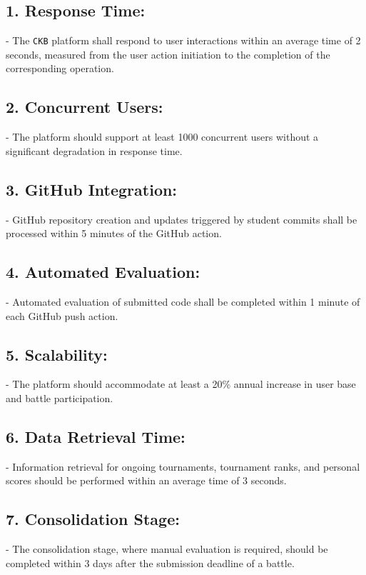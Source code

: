 \subsection*{1. Response Time:}
   - The \verb|CKB| platform shall respond to user interactions within an average time of 2 seconds, measured from the user action initiation to the completion of the corresponding operation.

\subsection*{2. Concurrent Users:}
   - The platform should support at least 1000 concurrent users without a significant degradation in response time.

\subsection*{3. GitHub Integration:}
   - GitHub repository creation and updates triggered by student commits shall be processed within 5 minutes of the GitHub action.

\subsection*{4. Automated Evaluation:}
   - Automated evaluation of submitted code shall be completed within 1 minute of each GitHub push action.

\subsection*{5. Scalability:}
   - The platform should accommodate at least a 20\% annual increase in user base and battle participation.

\subsection*{6. Data Retrieval Time:}
   - Information retrieval for ongoing tournaments, tournament ranks, and personal scores should be performed within an average time of 3 seconds.

\subsection*{7. Consolidation Stage:}
   - The consolidation stage, where manual evaluation is required, should be completed within 3 days after the submission deadline of a battle.

